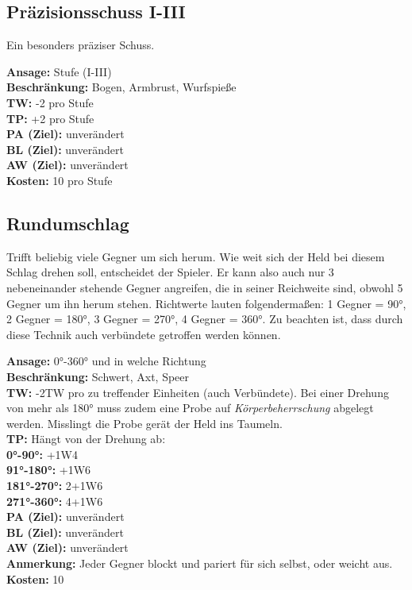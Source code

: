 \subsection{Präzisionsschuss I-III}
Ein besonders präziser Schuss.

\textbf{Ansage:} Stufe (I-III)\\
\textbf{Beschränkung:} Bogen, Armbrust, Wurfspieße\\
\textbf{TW:} -2 pro Stufe\\
\textbf{TP:} +2 pro Stufe\\
\textbf{PA (Ziel):} unverändert \\
\textbf{BL (Ziel):} unverändert \\
\textbf{AW (Ziel):} unverändert \\
\textbf{Kosten:} 10 pro Stufe

\subsection{Rundumschlag}
Trifft beliebig viele Gegner um sich herum. Wie weit sich der Held bei diesem Schlag drehen soll, entscheidet der Spieler. Er kann also auch nur 3 nebeneinander stehende Gegner angreifen, die in seiner Reichweite sind, obwohl 5 Gegner um ihn herum stehen. Richtwerte lauten folgendermaßen: 1 Gegner = 90°, 2 Gegner = 180°, 3 Gegner = 270°, 4 Gegner = 360°. Zu beachten ist, dass durch diese Technik auch verbündete getroffen werden können.

\textbf{Ansage:} 0°-360° und in welche Richtung \\
\textbf{Beschränkung:} Schwert, Axt, Speer \\
\textbf{TW:} -2TW pro zu treffender Einheiten (auch Verbündete). Bei einer Drehung von mehr als 180° muss zudem eine Probe auf \textit{Körperbeherrschung} abgelegt werden. Misslingt die Probe gerät der Held ins Taumeln. \\
\textbf{TP:} Hängt von der Drehung ab: \\
\tab\textbf{0°-90°:} +1W4 \\
\tab\textbf{91°-180°:} +1W6 \\
\tab\textbf{181°-270°:} 2+1W6 \\
\tab\textbf{271°-360°:} 4+1W6 \\
\textbf{PA (Ziel):} unverändert \\
\textbf{BL (Ziel):} unverändert \\
\textbf{AW (Ziel):} unverändert \\
\textbf{Anmerkung:} Jeder Gegner blockt und pariert für sich selbst, oder weicht aus. \\
\textbf{Kosten:} 10

